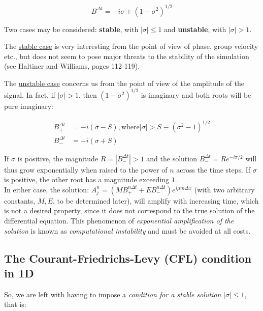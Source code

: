 	\begin{equation}
		B^{\Delta t} = -i \sigma \pm \left( 1 - \sigma^2 \right)^{1/2} 
		\label{adv-CTCS-1D-eigenvalues}
	\end{equation}
	

	Two cases may be considered: \textbf{stable}, with $|\sigma| \leq 1$ and \textbf{unstable}, with $|\sigma| > 1$.
	\medskip
	
	The \underline{stable case} is very interesting from the point of view of phase, group velocity etc., but does not seem to pose major threats to the stability of the simulation (see Haltiner and Williams, pages 112-119).
	
	\medskip
	The \underline{unstable case} concerns us from the point of view of the amplitude of the signal. In fact, if $|\sigma| > 1$, then $\left( 1 - \sigma^2 \right)^{1/2}$ is imaginary and both roots will be pure imaginary:
	
	
	\begin{align}
		B_{+}^{\Delta t}  &= -i \left ( \sigma -S \right)  \mathrm{,where } | \sigma| > S \equiv \left(  \sigma^2 - 1 \right)^{1/2} \nonumber \\
		B_{-}^{\Delta t}  &= -i \left ( \sigma +S \right)  \nonumber
		\label{adv-CTCS-1D-unstable-solution}
	\end{align}
	
	If $\sigma$ is positive, the magnitude $R=|B_{-}^{\Delta t}| > 1$ and the solution $ B_{-}^{\Delta t} = R e^{-i \pi /2 }$ will thus grow exponentially when raised to the power of $n$ across the time steps. If $\sigma$ is positive, the other root has a magnitude exceeding $1$. \\
	In either case, the solution: $A_j^{n} = \left( M B_{+}^{n \Delta t}+ E B_{-}^{n \Delta t} \right)e^{i \mu m \Delta x}$  (with two arbitrary constants, $M,E$, to be determined later), will amplify with increasing time, which is not a desired property, since it does not correspond to the true solution of the differential equation. This phenomenon of \emph{exponential amplification of the solution} is known as \emph{computational instability} and must be avoided at all costs. 
	
\subsection{The Courant-Friedrichs-Levy (CFL) condition in 1D}

	So, we are left with having to impose a \emph{condition for a stable solution} $|\sigma| \leq 1$, that is:
	
